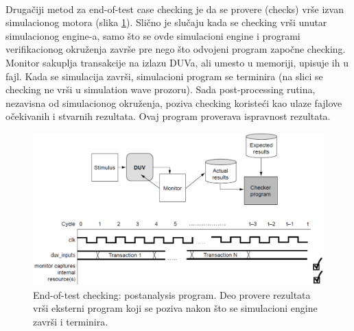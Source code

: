 \documentclass[a4paper, 12pt]{article}
\begin{document}
\\\indent Drugačiji metod za end-of-test case checking je da se provere (checks) vrše izvan simulacionog motora (slika \ref{img3}). Slično je slučaju kada se checking vrši unutar simulacionog engine-a, samo što se ovde simulacioni engine i programi verifikacionog okruženja završe pre nego što odvojeni program započne checking. Monitor sakuplja transakcije na izlazu DUVa, ali umesto u memoriji, upisuje ih u fajl. Kada se simulacija završi, simulacioni program se terminira (na slici se checking ne vrši u simulation wave prozoru). Sada post-processing rutina, nezavisna od simulacionog okruženja, poziva checking koristeći kao ulaze fajlove očekivanih i stvarnih rezultata. Ovaj program proverava ispravnost rezultata.
\begin{figure}[h!]
\centering
\includegraphics[width=1\textwidth]{img3.png}
\caption{End-of-test checking: postanalysis program. Deo provere rezultata vrši eksterni program koji se poziva nakon što se simulacioni engine završi i terminira.}
\label{img3}
\end{figure} 
\end{document}
